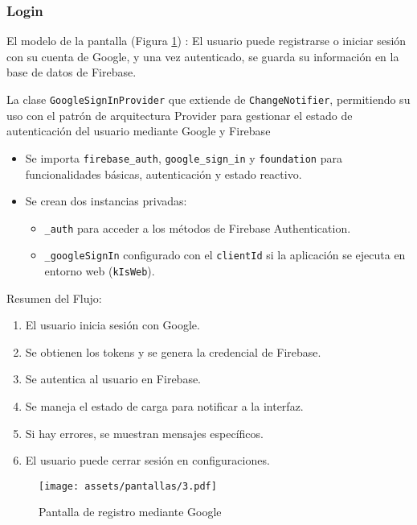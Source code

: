 \newpage
\subsubsection*{Login}
El modelo de la pantalla (Figura \ref{pantallas2})%
: El usuario puede registrarse o iniciar sesión con su cuenta de Google, y una vez autenticado, se guarda su información en la base de datos de Firebase.


La clase \texttt{GoogleSignInProvider} que extiende de \texttt{ChangeNotifier}, permitiendo su uso con el patrón de arquitectura Provider para gestionar el estado de autenticación del usuario mediante Google y Firebase

\begin{itemize}
    \item Se importa \texttt{firebase\_auth}, \texttt{google\_sign\_in} y \texttt{foundation} para funcionalidades básicas, autenticación y estado reactivo.
    \item Se crean dos instancias privadas:
    \begin{itemize}
        \item \texttt{\_auth} para acceder a los métodos de Firebase Authentication.
        \item \texttt{\_googleSignIn} configurado con el \texttt{clientId} si la aplicación se ejecuta en entorno web (\texttt{kIsWeb}).
    \end{itemize}
\end{itemize}


Resumen del Flujo:

\begin{enumerate}
    \item El usuario inicia sesión con Google.
    \item Se obtienen los tokens y se genera la credencial de Firebase.
    \item Se autentica al usuario en Firebase.
    \item Se maneja el estado de carga para notificar a la interfaz.
    \item Si hay errores, se muestran mensajes específicos.
    \item El usuario puede cerrar sesión en configuraciones.
\end{enumerate}


\begin{figure}[h!]
\centering
  \texttt{[image: assets/pantallas/3.pdf]}
  \caption{Pantalla de registro mediante Google}
  \label{pantallas2}
\end{figure}

